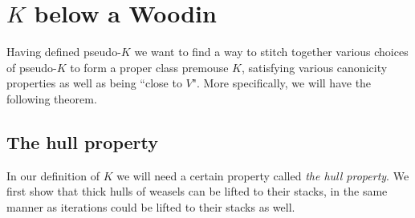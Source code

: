\chapter{$K$ below a Woodin}
\thispagestyle{fancy}
\label{ch8}

Having defined pseudo-$K$ we want to find a way to stitch together various choices of pseudo-$K$ to form a proper class premouse $K$, satisfying various canonicity properties as well as being ``close to $V$". More specifically, we will have the following theorem.



\section{The hull property}

In our definition of $K$ we will need a certain property called \textit{the hull property}. We first show that thick hulls of weasels can be lifted to their stacks, in the same manner as iterations could be lifted to their stacks as well.

